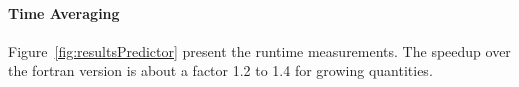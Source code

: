 \documentclass{acm_proc_article-sp}
\begin{document}
  





\paragraph{Time Averaging}
Figure~\ref{fig:resultsPredictor} present the runtime measurements. The speedup over the fortran version is about a factor 1.2 to 1.4 for growing quantities.
\end{document}
